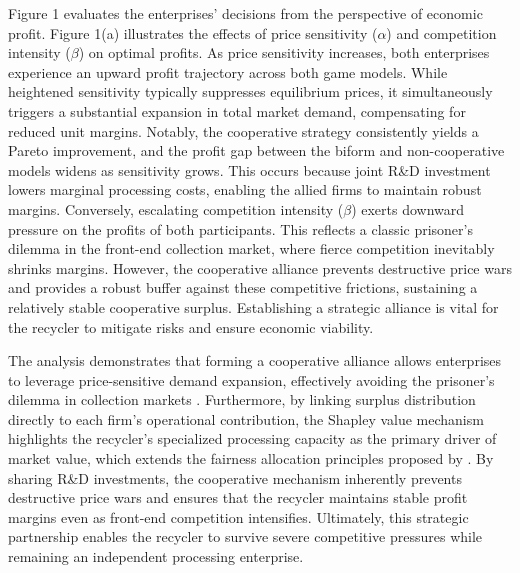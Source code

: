 \documentclass[authoryear,preprint,review,times,10pt]{elsarticle}
\begin{document}
Figure 1 evaluates the enterprises' decisions from the perspective of economic profit. Figure 1(a) illustrates the effects of price sensitivity ($\alpha$) and competition intensity ($\beta$) on optimal profits. As price sensitivity increases, both enterprises experience an upward profit trajectory across both game models. While heightened sensitivity typically suppresses equilibrium prices, it simultaneously triggers a substantial expansion in total market demand, compensating for reduced unit margins. Notably, the cooperative strategy consistently yields a Pareto improvement, and the profit gap between the biform and non-cooperative models widens as sensitivity grows. This occurs because joint R\&D investment lowers marginal processing costs, enabling the allied firms to maintain robust margins. Conversely, escalating competition intensity ($\beta$) exerts downward pressure on the profits of both participants. This reflects a classic prisoner's dilemma in the front-end collection market, where fierce competition inevitably shrinks margins. However, the cooperative alliance prevents destructive price wars and provides a robust buffer against these competitive frictions, sustaining a relatively stable cooperative surplus. Establishing a strategic alliance is vital for the recycler to mitigate risks and ensure economic viability.

The analysis demonstrates that forming a cooperative alliance allows enterprises to leverage price-sensitive demand expansion, effectively avoiding the prisoner's dilemma in collection markets \citep{lin2025Cooperation}. Furthermore, by linking surplus distribution directly to each firm's operational contribution, the Shapley value mechanism highlights the recycler's specialized processing capacity as the primary driver of market value, which extends the fairness allocation principles proposed by \cite{jia2023Novel}. By sharing R\&D investments, the cooperative mechanism inherently prevents destructive price wars and ensures that the recycler maintains stable profit margins even as front-end competition intensifies. Ultimately, this strategic partnership enables the recycler to survive severe competitive pressures while remaining an independent processing enterprise.
\end{document}
